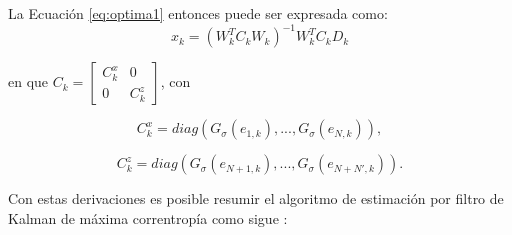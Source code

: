 La Ecuaci\'on \ref{eq:optima1} entonces puede ser expresada como:
\begin{equation}
x_k = \left( W^T_k C_k W_k \right)^{-1} W^T_k C_k D_k
\end{equation}

en que $C_k = \begin{bmatrix}
C^{x}_k & 0\\
0 & C^{z}_k
\end{bmatrix} $, con 

\begin{equation}
C^{x}_{k}= diag(G_{\sigma}(e_{1, k}),..., G_{\sigma}(e_{N, k})),
\label{eq:Cx}
\end{equation}

\begin{equation}
{C^{z}_{k}}= diag(G_{\sigma}(e_{N+1, k}),..., G_{\sigma}(e_{N+N', k})).
\label{eq:Cz}
\end{equation}

Con estas derivaciones es posible resumir el algoritmo de estimaci\'on por filtro de Kalman de m\'axima correntrop\'ia como sigue \cite{badong}:

